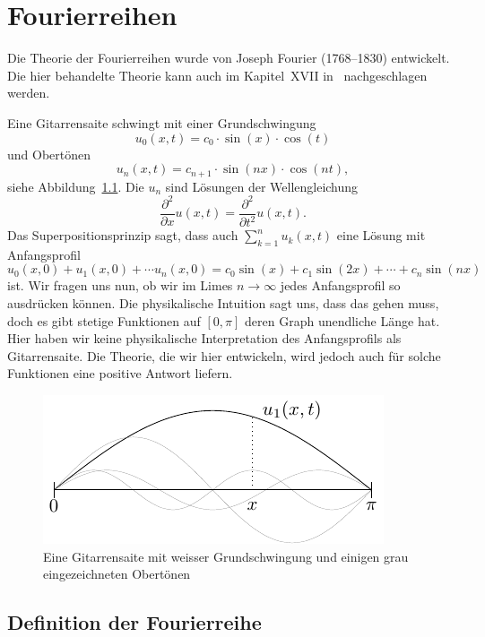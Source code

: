 \documentclass[../main.tex]{subfiles}
\begin{document}
\chapter{Fourierreihen}
Die Theorie der Fourierreihen wurde von Joseph Fourier
(1768--1830) entwickelt.
Die hier behandelte Theorie kann auch im Kapitel~XVII
in~\cite{heuser} nachgeschlagen werden.


\begin{motivation}
  Eine Gitarrensaite schwingt mit einer Grundschwingung
  \[
    u_0(x, t) = c_0 \cdot \sin(x) \cdot \cos(t)
  \]
  und Obertönen
  \[
    u_n(x, t) = c_{n+1} \cdot \sin(nx) \cdot \cos(nt),
  \]
  siehe Abbildung~\ref{fig:guitar}.
  Die $u_n$ sind Lösungen der Wellengleichung
  \[
    \frac{\partial^2}{\partial x} u(x, t)
    =
    \frac{\partial^2}{\partial t^2} u(x, t).
  \]
  Das Superpositionsprinzip sagt, dass auch
  $\sum_{k=1}^{n} u_k(x, t)$ eine Lösung
  mit Anfangsprofil 
  \[
    u_0(x, 0) + u_1(x, 0) + \cdots u_n(x, 0)
    = c_0 \sin(x) + c_1 \sin(2x) + \cdots + c_n \sin(nx)
  \]
  ist.
  Wir fragen uns nun, ob wir im Limes $n \to \infty$ 
  jedes Anfangsprofil so ausdrücken können.
  Die physikalische Intuition sagt uns, dass das gehen muss,
  doch es gibt stetige Funktionen auf $[0, \pi]$
  deren Graph unendliche Länge
  hat.
  Hier haben wir keine physikalische Interpretation des
  Anfangsprofils als Gitarrensaite. Die Theorie, die wir hier
  entwickeln, wird jedoch auch für solche Funktionen
  eine positive Antwort liefern.

\begin{figure}[htb]
  \centering
  \includegraphics{images/guitar}
  \caption{Eine Gitarrensaite mit weisser Grundschwingung
  und einigen grau eingezeichneten Obertönen}%
  \label{fig:guitar}
\end{figure}
\end{motivation}

\section{Definition der Fourierreihe}
\end{document}
